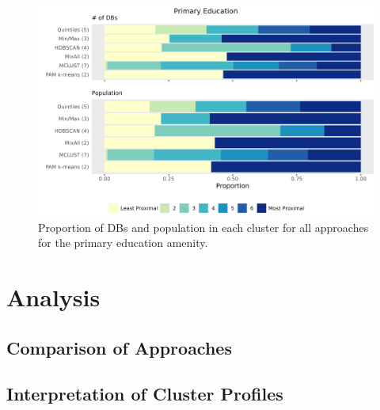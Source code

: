 \documentclass[11pt, a4paper]{article}
\begin{document}
\begin{figure}[H]
\centering
\includegraphics[width=\textwidth]{./barplot_comparison/Primary Education_barplot.png}
\caption[Primary education profile barplot]{Proportion of DBs and population in each cluster for all approaches for the primary education amenity.}\label{prieducbarplot}
\end{figure}













\pagebreak 
\section{Analysis}


\subsection{Comparison of Approaches}


















\subsection{Interpretation of Cluster Profiles}
\end{document}
